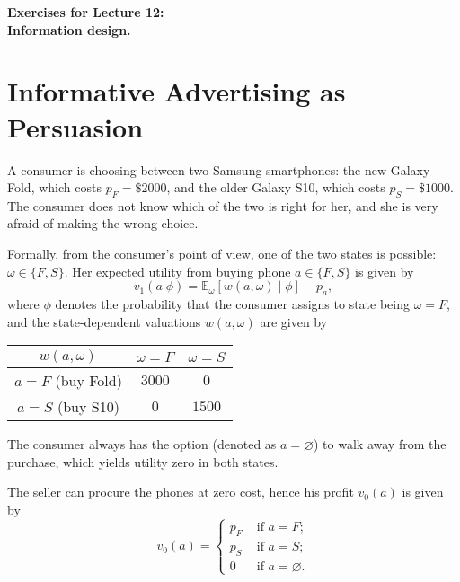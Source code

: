 \documentclass[a4paper]{article}
\begin{document}
\begin{center}
		\LARGE\textbf{Exercises for Lecture 12:\\ Information design.}
\end{center}



\section{Informative Advertising as Persuasion}

	A consumer is choosing between two Samsung smartphones: the new Galaxy Fold, which costs $p_F = \$ 2000$, and the older Galaxy S10, which costs $p_S = \$1000$. The consumer does not know which of the two is right for her, and she is very afraid of making the wrong choice. 
	
	Formally, from the consumer's point of view, one of the two states is possible: $\omega \in \{F,S\}$. Her expected utility from buying phone $a \in \{F,S\}$ is given by
	\begin{equation*}
		v_1(a|\phi) = \mathbb{E}_\omega \left[ w(a,\omega) \mid \phi \right] - p_a,
	\end{equation*}
	where $\phi$ denotes the probability that the consumer assigns to state being $\omega = F$, and the state-dependent valuations $w(a,\omega)$ are given by
	\begin{center}
		\begin{tabular}{c | c | c |}
			$w(a,\omega)$ 		& $\omega = F$ 	& $\omega = S$ \\ \hline
			$a=F$ (buy Fold)	& $3000$ 	& $0$	\\ \hline
			$a=S$ (buy S10)		& $0$ 	& $1500$	\\ \hline
		\end{tabular}
	\end{center}
	The consumer always has the option (denoted as $a = \varnothing$) to walk away from the purchase, which yields utility zero in both states.
	
	The seller can procure the phones at zero cost, hence his profit $v_0(a)$ is given by
	\begin{equation*}
		v_0(a) = 
		\begin{cases}
			p_F & \text{ if } a=F; \\
			p_S & \text{ if } a=S; \\
			0 & \text{ if } a=\varnothing.
		\end{cases}
	\end{equation*}
	
\end{document}
